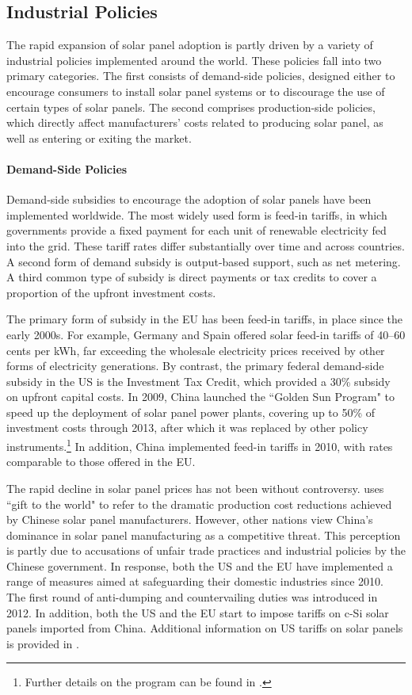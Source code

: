 \documentclass[12pt, letter]{article}
\begin{document}
\subsection{Industrial Policies}
\label{subsec:ind_policy}
The rapid expansion of solar panel adoption is partly driven by a variety of industrial policies implemented around the world.  These policies fall into two primary categories.  The first consists of demand-side policies, designed either to encourage consumers to install solar panel systems or to discourage the use of certain types of solar panels. The second comprises production-side policies, which directly affect manufacturers' costs related to producing solar panel, as well as entering or exiting the market.

\paragraph{Demand-Side Policies}
Demand-side subsidies to encourage the adoption of solar panels have been implemented worldwide. The most widely used form is feed-in tariffs, in which governments provide a fixed payment for each unit of renewable electricity fed into the grid. These tariff rates differ substantially over time and across countries. A second form of demand subsidy is output-based support, such as net metering. A third common type of subsidy is direct payments or tax credits to cover a proportion of the upfront investment costs. 

The primary form of subsidy in the EU has been feed-in tariffs, in place since the early 2000s. For example, Germany and Spain offered solar feed-in tariffs of 40–60 cents per kWh, far exceeding the wholesale electricity prices received by other forms of electricity generations. By contrast, the primary federal demand-side subsidy in the US is the Investment Tax Credit, which provided a 30\% subsidy on upfront capital costs. In 2009, China launched the ``Golden Sun Program" to speed up the deployment of solar panel power plants, covering up to 50\% of investment costs through 2013, after which it was replaced by other policy instruments.\footnote{Further details on the program can be found in \cite{iea_golden_sun_2021}.} In addition, China implemented feed-in tariffs in 2010, with rates comparable to those offered in the EU.

The rapid decline in solar panel prices has not been without controversy. \citet{nemet2019solar} uses ``gift to the world" to refer to the dramatic production cost reductions achieved by Chinese solar panel manufacturers. However, other nations view China's dominance in solar panel manufacturing as a competitive threat. This perception is partly due to accusations of unfair trade practices and industrial policies by the Chinese government. In response, both the US and the EU have implemented a range of measures aimed at safeguarding their domestic industries since 2010. The first round of anti-dumping and countervailing duties was introduced in 2012. In addition, both the US and the EU start to impose tariffs on c-Si solar panels imported from China. Additional information on US tariffs on solar panels is provided in \citet{bollinger2025strategic}.
\end{document}
